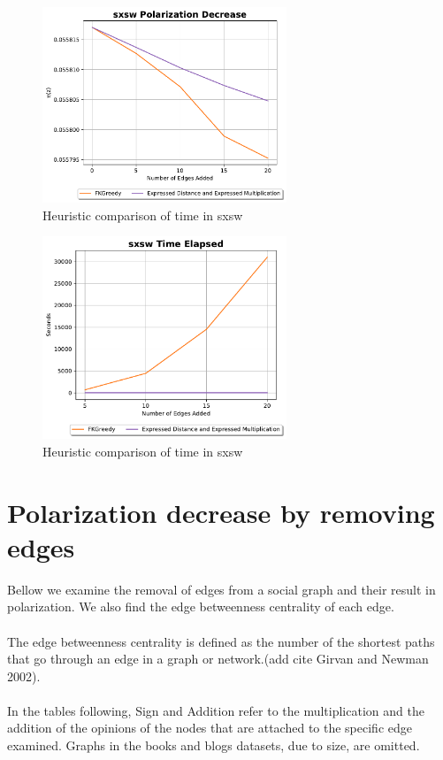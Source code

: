 \begin{figure}[!htbp]
	\centering
	\includegraphics[width=0.65\textwidth]{Figures/sxsw Polarization Decrease}
	\caption{Heuristic comparison of time in sxsw}
	\label{fig:sxsw_pol}
\end{figure}


\begin{figure}[!htbp]
	\centering
	\includegraphics[width=0.65\textwidth]{Figures/sxsw Time Elapsed}
	\caption{Heuristic comparison of time in sxsw}
	\label{fig:sxsw_time}
\end{figure}

\clearpage


\section{Polarization decrease by removing edges}
\label{sec:polremovingdecrease}
Bellow we examine the removal of edges from a social graph and their result in polarization. We also find the edge betweenness centrality of each edge. 
\\
\\
The edge betweenness centrality is defined as the number of the shortest paths that go through an edge in a graph or network.(add cite Girvan and Newman 2002). 
\\
\\
In the tables following, Sign and Addition refer to the multiplication and the addition of the opinions of the nodes that are attached to the specific edge examined. Graphs in the books and blogs datasets, due to size, are omitted.
\\
\\

